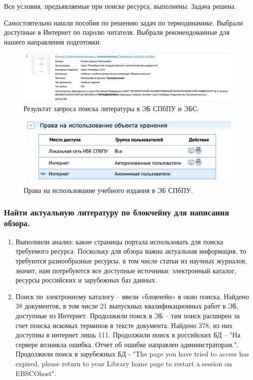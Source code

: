 \documentclass[14pt,a4paper,report]{report}
\begin{document}
Все условия, предъявляемые при поиске ресурса, выполнены. Задача решена.

Самостоятельно нашли пособия по решению задач по термодинамике. Выбрали доступные в Интернет по паролю читателя. Выбрали рекомендованные для нашего направления подготовки.


\begin{figure}[h!]
\centering
\includegraphics[scale = 0.33]{135.png}
\caption{Результат запроса поиска литературы в ЭБ СПбПУ и ЭБС.}
\label{image:1}
\end{figure}

\begin{figure}[h!]
\centering
\includegraphics[scale = 0.33]{136.png}
\caption{Права на использование учебного издания в ЭБ СПбПУ.}
\label{image:1}
\end{figure}

\subsubsection{Найти актуальную литературу по блокчейну для написания обзора.}

\begin{enumerate}
\item Выполнили анализ: какие страницы портала использовать для поиска требуемого ресурса. Поскольку для обзора важна актуальная информация, то требуются разнообразные ресурсы, в том числе статьи из научных журналов, значит, нам потребуются все доступные источники: электронный каталог, ресурсы российских и зарубежных баз данных.
\item Поиск по электронному каталогу – ввели «блокчейн» в окно поиска. Найдено 38 документов, в том числе 21 выпускных квалификационных работ в ЭБ, доступные из Интернет.
Продолжили поиск в ЭБ – там поиск расширен за счет поиска искомых терминов в тексте документа. Найдено 378, из них доступны в интернет лишь 111.
Продолжили поиск в российских БД – "На сервере возникла ошибка. Отчет об ошибке направлен администраторам.".
Продолжили поиск в зарубежных БД - "The page you have tried to access has expired, please return to your Library home page to restart a session on EBSCOhost".
\end{enumerate}
\end{document}
